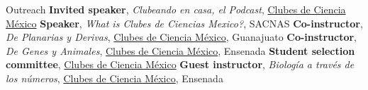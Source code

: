 \begin{rubric}{Outreach}
\entry*[2020]
	\textbf{Invited speaker}, \emph{Clubeando en casa, el Podcast},
	\href{http://www.clubesdeciencia.mx/}{Clubes de Ciencia México}
\entry*[2017]
	\textbf{Speaker}, \emph{What is Clubes de Ciencias Mexico?}, SACNAS
\entry*[2016]
	\textbf{Co-instructor}, \emph{De Planarias y Derivas},
	\href{http://www.clubesdeciencia.mx/}{Clubes de Ciencia México}, Guanajuato
\entry*[2016]
	  \textbf{Co-instructor}, \emph{De Genes y Animales},
		\href{http://www.clubesdeciencia.mx/}{Clubes de Ciencia México}, Ensenada
\entry*[2015]
	  \textbf{Student selection committee},
		\href{http://www.clubesdeciencia.mx/}{Clubes de Ciencia México}
\entry*[2014]
  \textbf{Guest instructor}, \emph{Biología a través de los números},
	\href{http://www.clubesdeciencia.mx/}{Clubes de Ciencia México}, Ensenada

\end{rubric}
